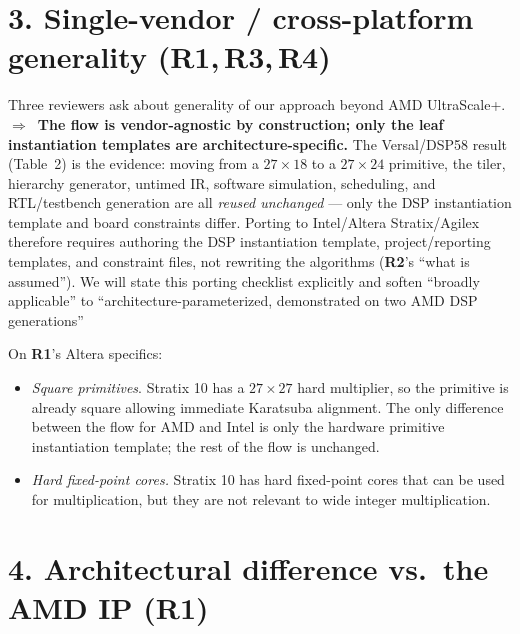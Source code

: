 \documentclass[10pt]{article}
\newcommand{\Ra}{\textbf{\textcolor{c1}{R1}}}
\newcommand{\Rb}{\textbf{\textcolor{c2}{R2}}}
\newcommand{\Rc}{\textbf{\textcolor{c3}{R3}}}
\newcommand{\Rd}{\textbf{\textcolor{c4}{R4}}}
\newcommand{\ans}{\textbf{$\Rightarrow$~}}
\begin{document}
\section*{3. Single-vendor / cross-platform generality \hfill {\normalsize(\Ra,\,\Rc,\,\Rd)}}

Three reviewers ask about generality of our approach beyond AMD UltraScale+.
\ans \textbf{The flow is vendor-agnostic by construction; only the leaf instantiation templates are architecture-specific.}
The Versal/DSP58 result (Table~2) is the evidence: moving from a $27{\times}18$ to a $27{\times}24$ primitive, the tiler, hierarchy generator, untimed IR, software simulation, scheduling, and RTL/testbench generation are all \emph{reused unchanged} --- only the DSP instantiation template and board constraints differ.
Porting to Intel/Altera Stratix/Agilex therefore requires authoring the DSP instantiation template, project/reporting templates, and constraint files, not rewriting the algorithms (\Rb's ``what is assumed'').
We will state this porting checklist explicitly and soften ``broadly applicable'' to ``architecture-parameterized, demonstrated on two AMD DSP generations''

On \Ra's Altera specifics:
\begin{itemize}
\item \emph{Square primitives}. Stratix 10 has a $27{\times}27$ hard multiplier, so the primitive is already square allowing immediate Karatsuba alignment. The only difference between the flow for AMD and Intel is only the hardware primitive instantiation template; the rest of the flow is unchanged.
\item \emph{Hard fixed-point cores.} Stratix 10 has hard fixed-point cores that can be used for multiplication, but they are not relevant to wide integer multiplication. 

\end{itemize}

\section*{4. Architectural difference vs.\ the AMD IP \hfill {\normalsize(\Ra)}}
\end{document}
